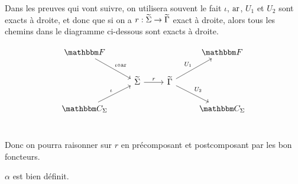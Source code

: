 \begin{rem}
    Dans les preuves qui vont suivre, on utilisera souvent le fait $\iota$, $\text{ar}$,
    $U_1$ et $U_2$ sont exacts à droite, et donc que si on a
    $r : \widetilde{\Sigma}\rightarrow\widetilde{\Gamma}$ exact à droite, alors tous les chemins dans le
    diagramme ci-dessous sont exacts à droite.
    
    \[\begin{tikzcd}
        \cf\arrow[dr, "\iota\circ\arf"] & & & \cf \\
        & \tsigma\arrow[r, "r"] & \tgamma\arrow[ur, "U_1"]\arrow[dr, "U_2"] & \\
        \C_\Sigma\arrow[ur, "\iota"] & & & \C_\Sigma \\
    \end{tikzcd}\]

    Donc on pourra raisonner sur $r$ en précomposant et postcomposant par les bon
    foncteurs.
\end{rem}

\begin{prop}
    $\alpha$ est bien définit.
\end{prop}

